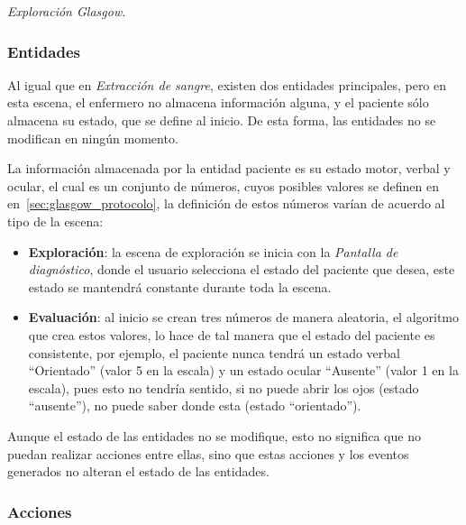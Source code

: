 \emph{Exploración Glasgow}.

\subsubsection{Entidades}


Al igual que en \emph{Extracción de sangre}, existen dos entidades principales,
pero en esta escena, el enfermero no almacena información alguna, y el
paciente sólo almacena su estado, que se define al inicio. De esta forma, las
entidades no se modifican en ningún momento.

La información almacenada por la entidad paciente es su estado motor, verbal y
ocular, el cual es un conjunto de números, cuyos posibles valores se definen en
en~\ref{sec:glasgow_protocolo}, la definición de estos números varían de acuerdo
al tipo de la escena:

\begin{itemize}
    \item \textbf{Exploración}: la escena de exploración se inicia con la
        \emph{Pantalla de diagnóstico}, donde el usuario selecciona el estado
        del paciente que desea, este estado se mantendrá constante durante toda
        la escena.
    \item \textbf{Evaluación}: al inicio se crean tres números de manera
        aleatoria, el algoritmo que crea estos valores, lo hace de tal manera
        que el estado del paciente es consistente, por ejemplo, el paciente
        nunca tendrá un estado verbal \enquote{Orientado} (valor 5 en la escala)
        y un estado ocular \enquote{Ausente} (valor 1 en la escala), pues esto
        no tendría sentido, si no puede abrir los ojos (estado
        \enquote{ausente}), no puede saber donde esta (estado
        \enquote{orientado}).
\end{itemize}

Aunque el estado de las entidades no se modifique, esto no significa que no
puedan realizar acciones entre ellas, sino que estas acciones y los eventos
generados no alteran el estado de las entidades.

\subsubsection{Acciones} 

